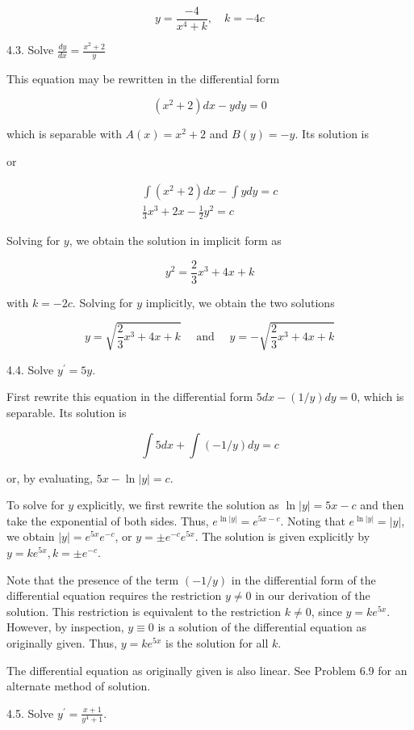 \documentclass[10pt]{article}
\begin{document}
$$
y=\frac{-4}{x^{4}+k}, \quad k=-4 c
$$

4.3. Solve $\frac{d y}{d x}=\frac{x^{2}+2}{y}$

This equation may be rewritten in the differential form

$$
\left(x^{2}+2\right) d x-y d y=0
$$

which is separable with $A(x)=x^{2}+2$ and $B(y)=-y$. Its solution is

or

$$
\begin{gathered}
\int\left(x^{2}+2\right) d x-\int y d y=c \\
\frac{1}{3} x^{3}+2 x-\frac{1}{2} y^{2}=c
\end{gathered}
$$

Solving for $y$, we obtain the solution in implicit form as

$$
y^{2}=\frac{2}{3} x^{3}+4 x+k
$$

with $k=-2 c$. Solving for $y$ implicitly, we obtain the two solutions

$$
y=\sqrt{\frac{2}{3} x^{3}+4 x+k} \quad \text { and } \quad y=-\sqrt{\frac{2}{3} x^{3}+4 x+k}
$$

4.4. Solve $y^{\prime}=5 y$.

First rewrite this equation in the differential form $5 d x-(1 / y) d y=0$, which is separable. Its solution is

$$
\int 5 d x+\int(-1 / y) d y=c
$$

or, by evaluating, $5 x-\ln |y|=c$.

To solve for $y$ explicitly, we first rewrite the solution as $\ln |y|=5 x-c$ and then take the exponential of both sides. Thus, $e^{\ln |y|}=e^{5 x-c}$. Noting that $e^{\ln |y|}=|y|$, we obtain $|y|=e^{5 x} e^{-c}$, or $y= \pm e^{-c} e^{5 x}$. The solution is given explicitly by $y=k e^{5 x}, k= \pm e^{-c}$.

Note that the presence of the term $(-1 / y)$ in the differential form of the differential equation requires the restriction $y \neq 0$ in our derivation of the solution. This restriction is equivalent to the restriction $k \neq 0$, since $y=k e^{5 x}$. However, by inspection, $y \equiv 0$ is a solution of the differential equation as originally given. Thus, $y=k e^{5 x}$ is the solution for all $k$.

The differential equation as originally given is also linear. See Problem 6.9 for an alternate method of solution.

4.5. Solve $y^{\prime}=\frac{x+1}{y^{4}+1}$.
\end{document}
